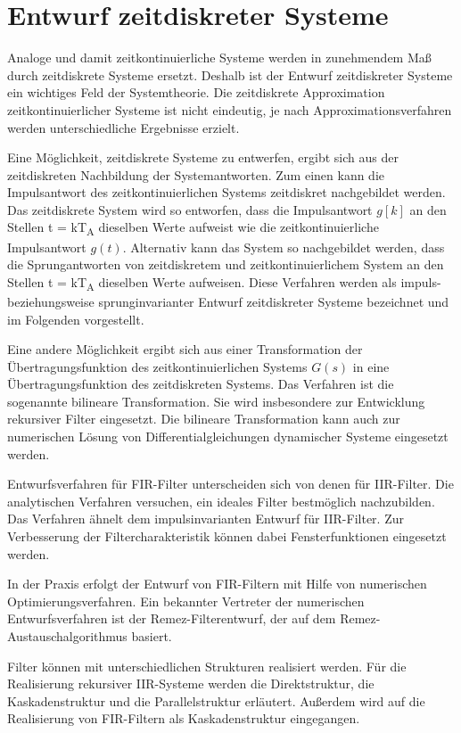 \chapter{Entwurf zeitdiskreter Systeme}\label{sec:entwurf-zeitdiskreter-systeme}

Analoge und damit zeitkontinuierliche Systeme werden in zunehmendem Maß durch zeitdiskrete Systeme ersetzt. Deshalb ist der Entwurf zeitdiskreter Systeme ein wichtiges Feld der Systemtheorie. Die zeitdiskrete Approximation zeitkontinuierlicher Systeme ist nicht eindeutig, je nach Approximationsverfahren werden unterschiedliche Ergebnisse erzielt.

Eine Möglichkeit, zeitdiskrete Systeme zu entwerfen, ergibt sich aus der zeitdiskreten Nachbildung der Systemantworten. Zum einen kann die Impulsantwort des zeitkontinuierlichen Systems zeitdiskret nachgebildet werden. Das zeitdiskrete System wird so entworfen, dass die Impulsantwort \(g[k]\) an den Stellen t = kT\textsubscript{A} dieselben Werte aufweist wie die zeitkontinuierliche Impulsantwort \(g(t)\). Alternativ kann das System so nachgebildet werden, dass die Sprungantworten von zeitdiskretem und zeitkontinuierlichem System an den Stellen t = kT\textsubscript{A} dieselben Werte aufweisen. Diese Verfahren werden als impuls- beziehungsweise sprunginvarianter Entwurf zeitdiskreter Systeme bezeichnet und im Folgenden vorgestellt.

Eine andere Möglichkeit ergibt sich aus einer Transformation der Übertragungsfunktion des zeitkontinuierlichen Systems \(G(s)\) in eine Übertragungsfunktion des zeitdiskreten Systems. Das Verfahren ist die sogenannte bilineare Transformation. Sie wird insbesondere zur Entwicklung rekursiver Filter eingesetzt. Die bilineare Transformation kann auch zur numerischen Lösung von Differentialgleichungen dynamischer Systeme eingesetzt werden.

Entwurfsverfahren für FIR-Filter unterscheiden sich von denen für IIR-Filter. Die analytischen Verfahren versuchen, ein ideales Filter bestmöglich nachzubilden. Das Verfahren ähnelt dem impulsinvarianten Entwurf für IIR-Filter. Zur Verbesserung der Filtercharakteristik können dabei Fensterfunktionen eingesetzt werden.

In der Praxis erfolgt der Entwurf von FIR-Filtern mit Hilfe von numerischen Optimierungsverfahren. Ein bekannter Vertreter der numerischen Entwurfsverfahren ist der Remez-Filterentwurf, der auf dem Remez-Austauschalgorithmus basiert.

Filter können mit unterschiedlichen Strukturen realisiert werden. Für die Realisierung rekursiver IIR-Systeme werden die Direktstruktur, die Kaskadenstruktur und die Parallelstruktur erläutert. Außerdem wird auf die Realisierung von FIR-Filtern als Kaskadenstruktur eingegangen.

